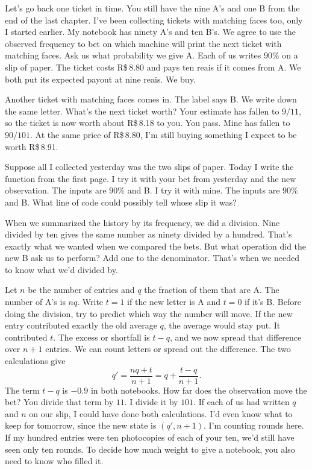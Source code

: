 
Let's go back one ticket in time. You still have the nine A's and one B from the end of the last chapter. I've been collecting tickets with matching faces too, only I started earlier. My notebook has ninety A's and ten B's. We agree to use the observed frequency to bet on which machine will print the next ticket with matching faces. Ask us what probability we give A. Each of us writes $90\%$ on a slip of paper. The ticket costs R\$\,8.80 and pays ten reais if it comes from A. We both put its expected payout at nine reais. We buy.

Another ticket with matching faces comes in. The label says B. We write down the same letter. What's the next ticket worth? Your estimate has fallen to $9/11$, so the ticket is now worth about R\$\,8.18 to you. You pass. Mine has fallen to $90/101$. At the same price of R\$\,8.80, I'm still buying something I expect to be worth R\$\,8.91.

Suppose all I collected yesterday was the two slips of paper. Today I write the function from the first page. I try it with your bet from yesterday and the new observation. The inputs are $90\%$ and B. I try it with mine. The inputs are $90\%$ and B. What line of code could possibly tell whose slip it was?

When we summarized the history by its frequency, we did a division. Nine divided by ten gives the same number as ninety divided by a hundred. That's exactly what we wanted when we compared the bets. But what operation did the new B ask us to perform? Add one to the denominator. That's when we needed to know what we'd divided by.

Let $n$ be the number of entries and $q$ the fraction of them that are A. The number of A's is $nq$. Write $t=1$ if the new letter is A and $t=0$ if it's B. Before doing the division, try to predict which way the number will move. If the new entry contributed exactly the old average $q$, the average would stay put. It contributed $t$. The excess or shortfall is $t-q$, and we now spread that difference over $n+1$ entries. We can count letters or spread out the difference. The two calculations give
\[
 q'=\frac{nq+t}{n+1}
    =q+\frac{t-q}{n+1}.
\]
The term $t-q$ is $-0.9$ in both notebooks. How far does the observation move the bet? You divide that term by $11$. I divide it by $101$. If each of us had written $q$ and $n$ on our slip, I could have done both calculations. I'd even know what to keep for tomorrow, since the new state is $(q',n+1)$. I'm counting rounds here. If my hundred entries were ten photocopies of each of your ten, we'd still have seen only ten rounds. To decide how much weight to give a notebook, you also need to know who filled it.

